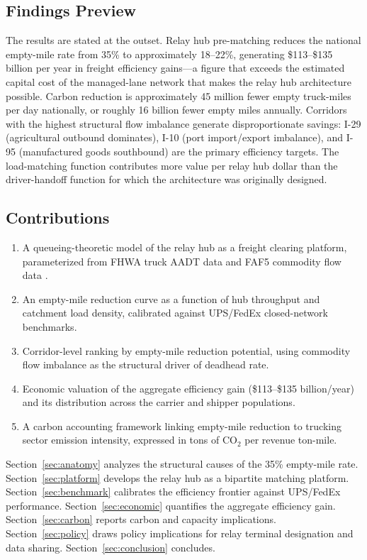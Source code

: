\subsection{Findings Preview}

The results are stated at the outset. Relay hub pre-matching reduces the national empty-mile rate from 35\% to approximately 18--22\%, generating \$113--\$135 billion per year in freight efficiency gains---a figure that exceeds the estimated capital cost of the managed-lane network that makes the relay hub architecture possible. Carbon reduction is approximately 45 million fewer empty truck-miles per day nationally, or roughly 16 billion fewer empty miles annually. Corridors with the highest structural flow imbalance generate disproportionate savings: I-29 (agricultural outbound dominates), I-10 (port import/export imbalance), and I-95 (manufactured goods southbound) are the primary efficiency targets. The load-matching function contributes more value per relay hub dollar than the driver-handoff function for which the architecture was originally designed.

\subsection{Contributions}

\begin{enumerate}
  \item A queueing-theoretic model of the relay hub as a freight clearing platform, parameterized from FHWA truck AADT data and FAF5 commodity flow data \citep{FAF5_2023}.
  \item An empty-mile reduction curve as a function of hub throughput and catchment load density, calibrated against UPS/FedEx closed-network benchmarks.
  \item Corridor-level ranking by empty-mile reduction potential, using commodity flow imbalance as the structural driver of deadhead rate.
  \item Economic valuation of the aggregate efficiency gain (\$113--\$135 billion/year) and its distribution across the carrier and shipper populations.
  \item A carbon accounting framework linking empty-mile reduction to trucking sector emission intensity, expressed in tons of CO$_2$ per revenue ton-mile.
\end{enumerate}

Section~\ref{sec:anatomy} analyzes the structural causes of the 35\% empty-mile rate. Section~\ref{sec:platform} develops the relay hub as a bipartite matching platform. Section~\ref{sec:benchmark} calibrates the efficiency frontier against UPS/FedEx performance. Section~\ref{sec:economic} quantifies the aggregate efficiency gain. Section~\ref{sec:carbon} reports carbon and capacity implications. Section~\ref{sec:policy} draws policy implications for relay terminal designation and data sharing. Section~\ref{sec:conclusion} concludes.
